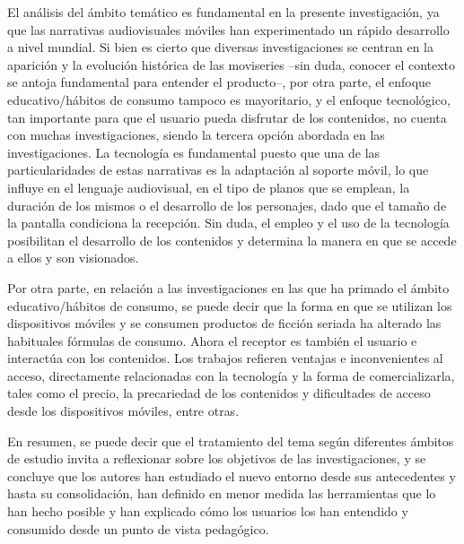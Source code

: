 \documentclass[spanish]{textolivre}
\begin{document}
El análisis del ámbito temático es fundamental en la presente investigación, ya que las narrativas audiovisuales móviles han experimentado un rápido desarrollo a nivel mundial. Si bien es cierto que diversas investigaciones se centran en la aparición y la evolución histórica de las moviseries –sin duda, conocer el contexto se antoja fundamental para entender el producto–, por otra parte, el enfoque educativo/hábitos de consumo tampoco es mayoritario, y el enfoque tecnológico, tan importante para que el usuario pueda disfrutar de los contenidos, no cuenta con muchas investigaciones, siendo la tercera opción abordada en las investigaciones. La tecnología es fundamental puesto que una de las particularidades de estas narrativas es la adaptación al soporte móvil, lo que influye en el lenguaje audiovisual, en el tipo de planos que se emplean, la duración de los mismos o el desarrollo de los personajes, dado que el tamaño de la pantalla condiciona la recepción. Sin duda, el empleo y el uso de la tecnología posibilitan el desarrollo de los contenidos y determina la manera en que se accede a ellos y son visionados.

Por otra parte, en relación a las investigaciones en las que ha primado el ámbito educativo/hábitos de consumo, se puede decir que la forma en que se utilizan los dispositivos móviles y se consumen productos de ficción seriada ha alterado las habituales fórmulas de consumo. Ahora el receptor es también el usuario e interactúa con los contenidos. Los trabajos refieren ventajas e inconvenientes al acceso, directamente relacionadas con la tecnología y la forma de comercializarla, tales como el precio, la precariedad de los contenidos y dificultades de acceso desde los dispositivos móviles, entre otras. 

En resumen, se puede decir que el tratamiento del tema según diferentes ámbitos de estudio invita a reflexionar sobre los objetivos de las investigaciones, y se concluye que los autores han estudiado el nuevo entorno desde sus antecedentes y hasta su consolidación, han definido en menor medida las herramientas que lo han hecho posible y han explicado cómo los usuarios los han entendido y consumido desde un punto de vista pedagógico. 
\end{document}
